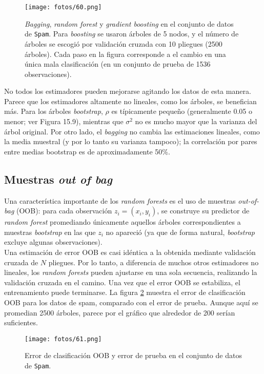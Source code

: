 \begin{figure}[h]
\centering
\texttt{[image: fotos/60.png]}
\caption{\textit{Bagging}, \textit{random forest} y \textit{gradient boosting} en el conjunto de datos de \texttt{Spam}. Para \textit{boosting} se usaron árboles de 5 nodos, y el número de árboles se escogió por validación cruzada con 10 pliegues (2500 árboles). Cada paso en la figura corresponde a el cambio en una única mala clasificación (en un conjunto de prueba de 1536 observaciones).}
\label{fig:20.9}
\end{figure}

No todos los estimadores pueden mejorarse agitando los datos de esta manera. Parece que los estimadores altamente no lineales, como los árboles, se benefician más. Para los árboles \textit{bootstrap}, $\rho$ es típicamente pequeño (generalmente 0.05 o menor; ver Figura 15.9), mientras que $\sigma^2$ no es mucho mayor que la varianza del árbol original. Por otro lado, el \textit{bagging} no cambia las estimaciones lineales, como la media muestral (y por lo tanto su varianza tampoco); la correlación por pares entre medias bootstrap es de aproximadamente 50\%. 

\subsection{Muestras \textit{out of bag}}

Una característica importante de los \textit{random forests} es el uso de muestras \textit{out-of-bag} (OOB): para cada observación $z_i = (x_i, y_i)$, se construye su predictor de \textit{random forest} promediando únicamente aquellos árboles correspondientes a muestras \textit{bootstrap} en las que $z_i$ no apareció (ya que de forma natural, \textit{bootstrap} excluye algunas observaciones). \\

Una estimación de error OOB es casi idéntica a la obtenida mediante validación cruzada de $N$ pliegues. Por lo tanto, a diferencia de muchos otros estimadores no lineales, los \textit{random forests} pueden ajustarse en una sola secuencia, realizando la validación cruzada en el camino. Una vez que el error OOB se estabiliza, el entrenamiento puede terminarse. La figura \ref{fig:20.4} muestra el error de clasificación OOB para los datos de spam, comparado con el error de prueba. Aunque aquí se promedian 2500 árboles, parece por el gráfico que alrededor de 200 serían suficientes.

\begin{figure}[h]
\centering
\texttt{[image: fotos/61.png]}
\caption{Error de clasificación OOB y error de prueba en el conjunto de datos de \texttt{Spam}.}
\label{fig:20.4}
\end{figure}


